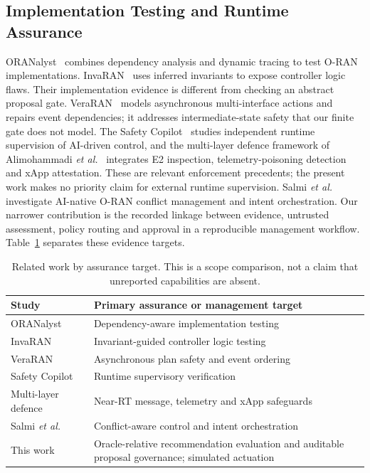 \documentclass[journal]{IEEEtran}
\newif\ifshowrevisions
\newenvironment{revision}{\begingroup\ifshowrevisions\color{blue}\else\color{black}\fi}{\endgroup}
\newcommand{\rev}[1]{{\ifshowrevisions\color{blue}\else\color{black}\fi #1}}
\begin{document}
\begin{revision}
\subsection{Implementation Testing and Runtime Assurance}
ORANalyst~\cite{oranalyst2024} combines dependency analysis and dynamic tracing
to test O-RAN implementations. InvaRAN~\cite{invaran2026} uses inferred
invariants to expose controller logic flaws. Their implementation evidence is
different from checking an abstract proposal gate. VeraRAN~\cite{veraran2026}
models asynchronous multi-interface actions and repairs event dependencies;
it addresses intermediate-state safety that our finite gate does not model.
The Safety Copilot~\cite{safetycopilot2026} studies independent runtime
supervision of AI-driven control, and the multi-layer defence framework of
Alimohammadi \emph{et al.}~\cite{multilayer2026} integrates E2 inspection,
telemetry-poisoning detection and xApp attestation. These are relevant
enforcement precedents; the present work makes no priority claim for external
runtime supervision. Salmi \emph{et al.}~\cite{salmi2026tnsm} investigate
AI-native O-RAN conflict management and intent orchestration. Our narrower
contribution is the recorded linkage between evidence, untrusted assessment,
policy routing and approval in a reproducible management workflow.
Table~\ref{tab:positioning} separates these evidence targets.
\begin{table}[!t]
\centering\ifshowrevisions\color{blue}\else\color{black}\fi\footnotesize
\caption{\rev{Related work by assurance target. This is a scope comparison, not a
claim that unreported capabilities are absent.}}
\label{tab:positioning}
\begin{tabular}{p{}p{}}
\toprule
Study & Primary assurance or management target \\
\midrule
ORANalyst~\cite{oranalyst2024} & Dependency-aware implementation testing \\
InvaRAN~\cite{invaran2026} & Invariant-guided controller logic testing \\
VeraRAN~\cite{veraran2026} & Asynchronous plan safety and event ordering \\
Safety Copilot~\cite{safetycopilot2026} & Runtime supervisory verification \\
Multi-layer defence~\cite{multilayer2026} & Near-RT message, telemetry and xApp safeguards \\
Salmi \emph{et al.}~\cite{salmi2026tnsm} & Conflict-aware control and intent orchestration \\
This work & Oracle-relative recommendation evaluation and auditable proposal governance; simulated actuation \\
\bottomrule
\end{tabular}
\end{table}
\end{revision}
\end{document}
